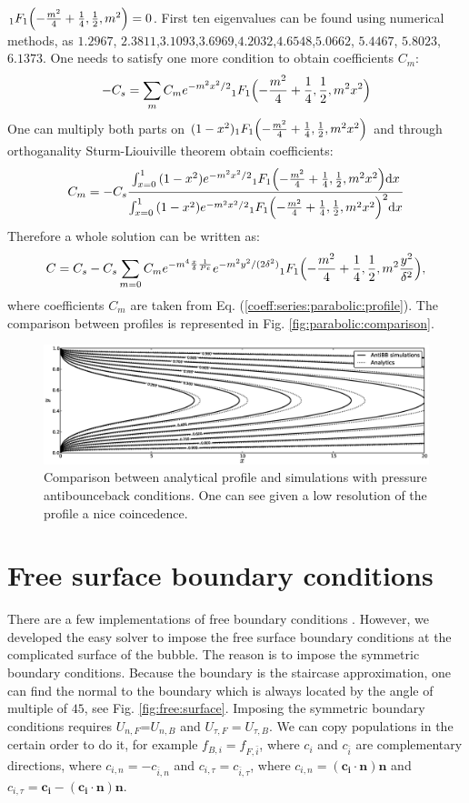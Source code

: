 \documentclass{article}
\newcommand{\beq}{\begin{equation}}
\newcommand{\feq}{\end{equation}}
\begin{document}
${_1F_1}\Bigl(-\frac{m^2}{4}+\frac{1}{4},\frac{1}{2},m^2 \Bigr)=0$. First ten eigenvalues can be
found using numerical methods, as $1.2967$, $2.3811$,$3.1093$,$3.6969$,$4.2032$,$4.6548$,$5.0662$,
$5.4467$, $5.8023$,$6.1373$. One needs to satisfy one more condition to obtain coefficients $C_m$:
\beq
-C_{s}=\sum_m{C_m e^{-m^2 x^2/2} {_1F_1}\Bigl(-\frac{m^2}{4}+\frac{1}{4},\frac{1}{2},m^2
x^2\Bigr)} 
\feq
One can multiply both parts on $(1-x^2){_1F_1}\Bigl(-\frac{m^2}{4}+\frac{1}{4},\frac{1}{2},m^2
x^2\Bigr)$ and through orthoganality Sturm-Liouiville theorem obtain coefficients:
\beq
\label{coeff:series:parabolic:profile}
C_m=-C_s \frac{\int_{x=0}^{1}{(1-x^2)e^{-m^2 x^2/2}
{_1F_1}\Bigl(-\frac{m^2}{4}+\frac{1}{4},\frac{1}{2},m^2
x^2\Bigr)\mathrm{d}x}}{\int_{x=0}^{1}{(1-x^2)e^{-m^2 x^2/2}
{_1F_1}\Bigl(-\frac{m^2}{4}+\frac{1}{4},\frac{1}{2},m^2
x^2\Bigr)^2\mathrm{d}x}}
\feq
Therefore a whole solution can be written as:
\begin{equation}
C=C_{s}-C_s \sum_{m=0}{C_m e^{-m^4 \frac{x}{\delta}\frac{1}{Pe}} e^{-m^2
y^2/(2\delta^2)}{_1F_1}\Bigl(-\frac{m^2}{4}+\frac{1}{4},\frac{1}{2},m^2 \frac{y^2}{\delta^2}\Bigr)},
\end{equation}
where coefficients $C_m$ are taken from Eq. (\ref{coeff:series:parabolic:profile}). The comparison
between profiles is represented in Fig. \ref{fig:parabolic:comparison}.
\begin{figure}[htb!]
\includegraphics[width=\textwidth]{Figures/parabolic_profile_comparison.eps}
\caption{Comparison between analytical profile and simulations with pressure antibounceback
conditions. One can see given a low resolution of the profile a nice coincedence.}
\end{figure}

\section{Free surface boundary conditions}
\label{appendix-free-surface}
There are a few implementations of free boundary conditions \cite{ginzburg-free,verberg-free}.
However, we developed the easy solver to impose the free surface boundary conditions at the
complicated surface of the bubble. The reason is to impose the symmetric boundary conditions.
Because the boundary is the staircase approximation, one can find the normal to the boundary which
is always located by the angle of multiple of $45$, see Fig. \ref{fig:free:surface}. Imposing the
symmetric boundary conditions requires $U_{n,F}$=$U_{n,B}$ and $U_{\tau,F}=U_{\tau,B}$. We can copy
populations in the certain order to do it, for example $f_{B,i}=f_{F,\bar{i}}$, where $c_i$ and
$c_{\bar{i}}$ are complementary directions, where $c_{i,n}=-c_{\bar{i},n}$ and
$c_{i,\tau}=c_{\bar{i},\tau}$, where $c_{i,n}=(\bm{c_i} \cdot \bm{n})\bm{n}$ and
$c_{i,\tau}=\bm{c_i}-(\bm{c_i}\cdot \bm{n})\bm{n}$.  
\end{document}

